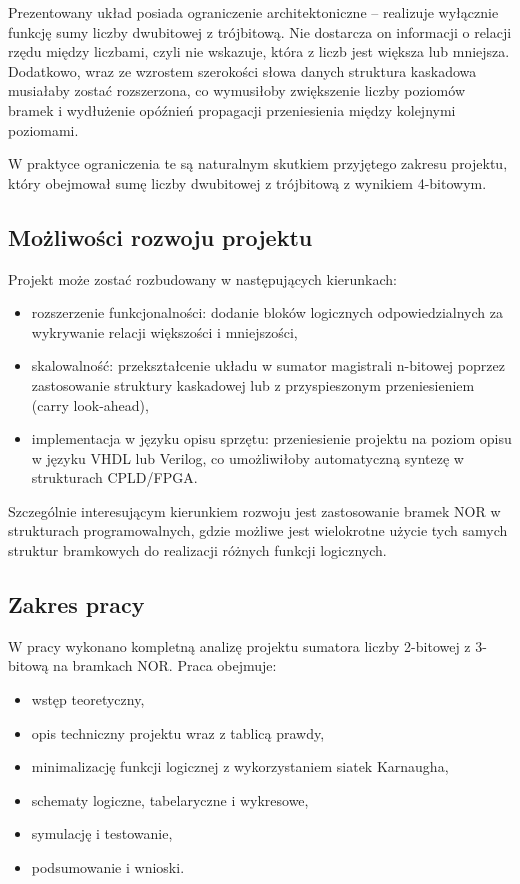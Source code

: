 \documentclass[11pt]{article}
\begin{document}
Prezentowany układ posiada ograniczenie architektoniczne -- realizuje wyłącznie funkcję sumy liczby dwubitowej z trójbitową. Nie dostarcza on informacji o relacji rzędu między liczbami, czyli nie wskazuje, która z liczb jest większa lub mniejsza. Dodatkowo, wraz ze wzrostem szerokości słowa danych struktura kaskadowa musiałaby zostać rozszerzona, co wymusiłoby zwiększenie liczby poziomów bramek i wydłużenie opóźnień propagacji przeniesienia między kolejnymi poziomami.

W praktyce ograniczenia te są naturalnym skutkiem przyjętego zakresu projektu, który obejmował sumę liczby dwubitowej z trójbitową z wynikiem 4-bitowym.

\subsection{Możliwości rozwoju projektu}

Projekt może zostać rozbudowany w następujących kierunkach:
\begin{itemize}
    \item rozszerzenie funkcjonalności: dodanie bloków logicznych odpowiedzialnych za wykrywanie relacji większości i mniejszości,
    \item skalowalność: przekształcenie układu w sumator magistrali n-bitowej poprzez zastosowanie struktury kaskadowej lub z przyspieszonym przeniesieniem (carry look-ahead),
    \item implementacja w języku opisu sprzętu: przeniesienie projektu na poziom opisu w języku VHDL lub Verilog, co umożliwiłoby automatyczną syntezę w strukturach CPLD/FPGA.
\end{itemize}

Szczególnie interesującym kierunkiem rozwoju jest zastosowanie bramek NOR w strukturach programowalnych, gdzie możliwe jest wielokrotne użycie tych samych struktur bramkowych do realizacji różnych funkcji logicznych.

\subsection{Zakres pracy}

W pracy wykonano kompletną analizę projektu sumatora liczby 2-bitowej z 3-bitową na bramkach NOR. Praca obejmuje:
\begin{itemize}
    \item wstęp teoretyczny,
    \item opis techniczny projektu wraz z tablicą prawdy,
    \item minimalizację funkcji logicznej z wykorzystaniem siatek Karnaugha,
    \item schematy logiczne, tabelaryczne i wykresowe,
    \item symulację i testowanie,
    \item podsumowanie i wnioski.
\end{itemize}
\end{document}
